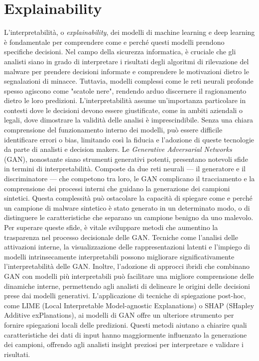 \section{Explainability}
L'interpretabilità, o \emph{explainability}, dei modelli di machine learning e deep learning è fondamentale per comprendere come e perché questi modelli prendono specifiche decisioni. Nel campo della sicurezza informatica, è cruciale che gli analisti siano in grado di interpretare i risultati degli algoritmi di rilevazione del malware per prendere decisioni informate e comprendere le motivazioni dietro le segnalazioni di minacce. Tuttavia, modelli complessi come le reti neurali profonde spesso agiscono come "scatole nere", rendendo arduo discernere il ragionamento dietro le loro predizioni.
L'interpretabilità assume un'importanza particolare in contesti dove le decisioni devono essere giustificate, come in ambiti aziendali o legali, dove dimostrare la validità delle analisi è imprescindibile. Senza una chiara comprensione del funzionamento interno dei modelli, può essere difficile identificare errori o bias, limitando così la fiducia e l'adozione di queste tecnologie da parte di analisti e decision makers.
Le \emph{Generative Adversarial Networks} (GAN), nonostante siano strumenti generativi potenti, presentano notevoli sfide in termini di interpretabilità. Composte da due reti neurali — il generatore e il discriminatore — che competono tra loro, le GAN complicano il tracciamento e la comprensione dei processi interni che guidano la generazione dei campioni sintetici. Questa complessità può ostacolare la capacità di spiegare come e perché un campione di malware sintetico è stato generato in un determinato modo, o di distinguere le caratteristiche che separano un campione benigno da uno malevolo.
Per superare queste sfide, è vitale sviluppare metodi che aumentino la trasparenza nel processo decisionale delle GAN. Tecniche come l'analisi delle attivazioni interne, la visualizzazione delle rappresentazioni latenti e l'impiego di modelli intrinsecamente interpretabili possono migliorare significativamente l'interpretabilità delle GAN. Inoltre, l'adozione di approcci ibridi che combinano GAN con modelli più interpretabili può facilitare una migliore comprensione delle dinamiche interne, permettendo agli analisti di delineare le origini delle decisioni prese dai modelli generativi.
L'applicazione di tecniche di spiegazione post-hoc, come LIME (Local Interpretable Model-agnostic Explanations) o SHAP (SHapley Additive exPlanations), ai modelli di GAN offre un ulteriore strumento per fornire spiegazioni locali delle predizioni. Questi metodi aiutano a chiarire quali caratteristiche dei dati di input hanno maggiormente influenzato la generazione dei campioni, offrendo agli analisti insight preziosi per interpretare e validare i risultati.

